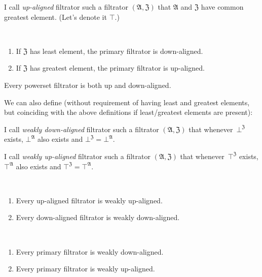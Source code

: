 \begin{defn}
I call \emph{up-aligned} filtrator such
a filtrator $(\mathfrak{A},\mathfrak{Z})$ that $\mathfrak{A}$ and
$\mathfrak{Z}$ have common greatest element. (Let's denote it $\top$.)\end{defn}
\begin{obvious}
\label{filt-aligned}~
\begin{enumerate}
\item If $\mathfrak{Z}$ has least element, the primary filtrator is down-aligned.
\item If $\mathfrak{Z}$ has greatest element, the primary filtrator is
up-aligned.
\end{enumerate}
\end{obvious}
\begin{cor}
Every powerset filtrator is both up and down-aligned.
\end{cor}
We can also define (without requirement of having least and greatest
elements, but coinciding with the above definitions if least/greatest
elements are present):
\begin{defn}
I call \emph{weakly down-aligned}
filtrator such a filtrator $(\mathfrak{A},\mathfrak{Z})$ that
whenever~$\bot^{\mathfrak{Z}}$ exists, $\bot^{\mathfrak{A}}$
also exists and $\bot^{\mathfrak{Z}}=\bot^{\mathfrak{A}}$.
\end{defn}

\begin{defn}
I call \emph{weakly up-aligned}
filtrator such a filtrator $(\mathfrak{A},\mathfrak{Z})$ that
whenever~$\top^{\mathfrak{Z}}$ exists, $\top^{\mathfrak{A}}$
also exists and $\top^{\mathfrak{Z}}=\top^{\mathfrak{A}}$.
\end{defn}

\begin{obvious}
~
\begin{enumerate}
 \item Every up-aligned filtrator is weakly up-aligned.
 \item Every down-aligned filtrator is weakly down-aligned.
\end{enumerate}
\end{obvious}

\begin{obvious}\label{f-weak-down-up}
~
\begin{enumerate}
\item Every primary filtrator is weakly down-aligned.
\item Every primary filtrator is weakly up-aligned.
\end{enumerate}
\end{obvious}

